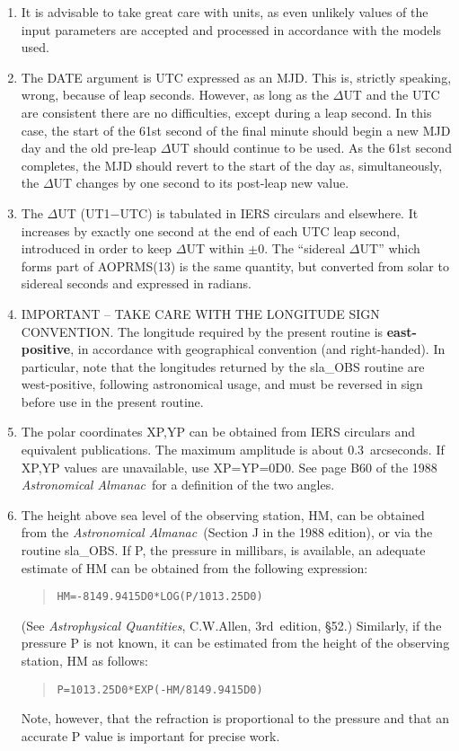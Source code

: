 \notes
{
 \begin{enumerate}
  \item It is advisable to take great care with units, as even
        unlikely values of the input parameters are accepted and
        processed in accordance with the models used.
  \item The DATE argument is UTC expressed as an MJD.  This is,
        strictly speaking, wrong, because of leap seconds.  However,
        as long as the $\Delta$UT and the UTC are consistent there
        are no difficulties, except during a leap second.  In this
        case, the start of the 61st second of the final minute should
        begin a new MJD day and the old pre-leap $\Delta$UT should
        continue to be used.  As the 61st second completes, the MJD
        should revert to the start of the day as, simultaneously,
        the $\Delta$UT changes by one second to its post-leap new value.
  \item The $\Delta$UT (UT1$-$UTC) is tabulated in IERS circulars and
        elsewhere.  It increases by exactly one second at the end of
        each UTC leap second, introduced in order to keep $\Delta$UT
        within $\pm0$.  The ``sidereal $\Delta$UT'' which forms
        part of AOPRMS(13) is the same quantity, but converted from solar
        to sidereal seconds and expressed in radians.
  \item IMPORTANT -- TAKE CARE WITH THE LONGITUDE SIGN CONVENTION.  The
        longitude required by the present routine is {\bf east-positive},
        in accordance with geographical convention (and right-handed).
        In particular, note that the longitudes returned by the
        sla\_OBS routine are west-positive, following astronomical
        usage, and must be reversed in sign before use in the present
        routine.
  \item The polar coordinates XP,YP can be obtained from IERS
        circulars and equivalent publications.  The
        maximum amplitude is about 0.3~arcseconds.  If XP,YP values
        are unavailable, use XP=YP=0D0.  See page B60 of the 1988
        {\it Astronomical Almanac}\, for a definition of the two angles.
  \item The height above sea level of the observing station, HM,
        can be obtained from the {\it Astronomical Almanac}\, (Section J
        in the 1988 edition), or via the routine sla\_OBS.  If P,
        the pressure in millibars, is available, an adequate
        estimate of HM can be obtained from the following expression:
        \begin{quote}
         \verb|HM=-8149.9415D0*LOG(P/1013.25D0)|
        \end{quote}
        (See {\it Astrophysical Quantities}, C.W.Allen, 3rd~edition,
        \S52.)  Similarly, if the pressure P is not known,
        it can be estimated from the height of the observing
        station, HM as follows:
        \begin{quote}
         \verb|P=1013.25D0*EXP(-HM/8149.9415D0)|
        \end{quote}
        Note, however, that the refraction is proportional to the
        pressure and that an accurate P value is important for
        precise work.
 \end{enumerate}
}
